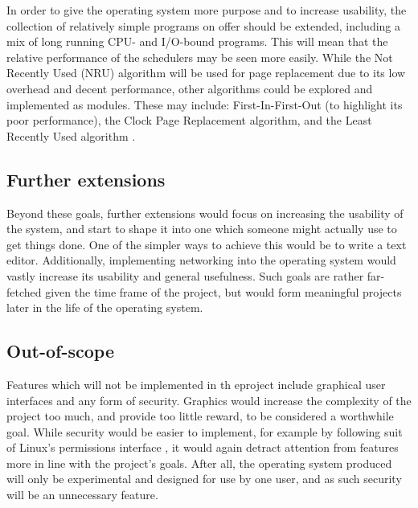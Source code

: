 \documentclass[10pt,a4paper]{article}
\begin{document}
In order to give the operating system more purpose and to increase usability,
the collection of relatively simple programs on offer should be extended,
including a mix of long running CPU- and I/O-bound programs. This will mean that
the relative performance of the schedulers may be seen more easily. While the
Not Recently Used (NRU) algorithm will be used for page replacement due to its
low overhead and decent performance, other algorithms could be explored and
implemented as modules. These may include: First-In-First-Out (to highlight its
poor performance), the Clock Page Replacement algorithm, and the Least Recently
Used algorithm \cite{PageReplacement}.

\subsection*{Further extensions}
Beyond these goals, further extensions would focus on increasing the usability
of the system, and start to shape it into one which someone might actually use
to get things done. One of the simpler ways to achieve this would be to write a
text editor. Additionally, implementing networking into the operating system
would vastly increase its usability and general usefulness. Such goals are
rather far-fetched given the time frame of the project, but would form
meaningful projects later in the life of the operating system.

\subsection*{Out-of-scope}
Features which will not be implemented in th eproject include graphical user
interfaces and any form of security. Graphics would increase the complexity of
the project too much, and provide too little reward, to be considered a
worthwhile goal. While security would be easier to implement, for example by
following suit of Linux's permissions interface \cite{permissions}, it would
again detract attention from features more in line with the project's goals.
After all, the operating system produced will only be experimental and designed
for use by one user, and as such security will be an unnecessary feature.
\end{document}
